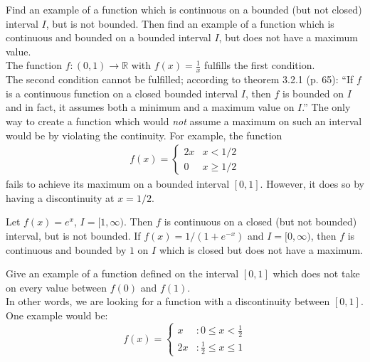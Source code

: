 \documentclass[12pt]{book}
\newcommand{\R}{\mathbb{R}}
\newenvironment{exercise}[2][Exercise]{\begin{trivlist}
\item[\hskip \labelsep {\bfseries #1}\hskip \labelsep {\bfseries #2.}]}{\end{trivlist}}
\begin{document}
\begin{exercise}{3.2.4}
Find an example of a function which is continuous on a bounded (but not closed) interval $I$, but is not bounded. Then find an example of a function which is continuous and bounded on a bounded interval $I$, but does not have a maximum value. \\

The function $f: (0,1) \to \R$ with $f(x)=\frac{1}{x}$ fulfills the first condition. \\
The second condition cannot be fulfilled; according to theorem 3.2.1 (p. 65): ``If $f$ is a continuous function on a closed bounded interval $I$, then $f$ is bounded on $I$ and in fact, it assumes both a minimum and a maximum value on $I$.'' The only way to create a function which would \emph{not} assume a maximum on such an interval would be by violating the continuity. For example, the function
	\begin{align*}
	f(x) =
		\begin{cases}
		2x & x< 1/2 \\
		0  & x \geq 1/2
		\end{cases}
	\end{align*}
fails to achieve its maximum on a bounded interval $[0,1]$. However, it does so by having a discontinuity at $x = 1/2$.
\end{exercise}

\begin{exercise}{3.2.5}
Let $f(x) = e^x$, $I = [1, \infty)$. Then $f$ is continuous on a closed (but not bounded) interval, but is not bounded. If $f(x) = 1/(1+e^{-x})$ and $I = [0, \infty)$, then $f$ is continuous and bounded by $1$ on $I$ which is closed but does not have a maximum.
\end{exercise}


\begin{exercise}{3.2.7}
Give an example of a function defined on the interval $[0,1]$ which does not take on every value between $f(0)$ and $f(1)$. \\

In other words, we are looking for a function with a discontinuity between $[0,1]$. One example would be:
 \begin{displaymath}
   f(x) = \left\{
     \begin{array}{lr}
       x & : 0 \leq x < \frac{1}{2} \\
       2x & : \frac{1}{2} \leq x \leq 1
     \end{array}
   \right.
\end{displaymath}

\end{exercise}
\end{document}
